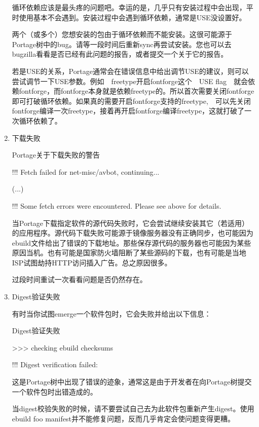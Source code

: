 \begin{enumerate}
循环依赖应该是最头疼的问题吧。幸运的是，几乎只有安装过程中会出现，平时使用基本不会遇到。安装过程中会遇到循环依赖，通常是USE没设置好。

两个（或多个）您想安装的包由于循环依赖而不能安装。这很可能源于Portage树中的bug。请等一段时间后重新sync再尝试安装。您也可以去bugzilla看看是否已经有此问题的报告，或者提交一个关于它的报告。

若是USE的关系，Portage通常会在错误信息中给出调节USE的建议，则可以尝试调节一下USE参数。例如　freetype开启fontforge这个　USE flag　就会依赖fontforge，而fontforge本身就是依赖freetype的。所以首次需要关闭fontforge即可打破循环依赖。如果真的需要开启fontforge支持的freetype,　可以先关闭fontforge编译一次freetype，接着再开启fontforge编译freetype，这就打破了一次循环依赖了。

\item 下载失败

\begin{example}{Portage关于下载失败的警告}
\begin{code}
!!! Fetch failed for net-misc/avbot, continuing...

(...)

!!! Some fetch errors were encountered.  Please see above for details.
\end{code}
\end{example}

当Portage下载指定软件的源代码失败时，它会尝试继续安装其它（若适用）的应用程序。源代码下载失败可能源于镜像服务器没有正确同步，也可能因为ebuild文件给出了错误的下载地址。那些保存源代码的服务器也可能因为某些原因当机。也有可能是国家防火墙阻断了某些源码的下载，也有可能是当地ISP试图劫持HTTP访问插入广告。总之原因很多。

过段时间重试一次看看问题是否仍然存在。

\item Digest验证失败

有时当你试图emerge一个软件包时，它会失败并给出以下信息：

\begin{example}{Digest验证失败}
\begin{code}
>>> checking ebuild checksums

!!! Digest verification failed:
\end{code}
\end{example}

这是Portage树中出现了错误的迹象，通常这是由于开发者在向Portage树提交一个软件包时出错造成的。

当digest校验失败的时候，请不要尝试自己去为此软件包重新产生digest。使用ebuild foo manifest并不能修复问题，反而几乎肯定会使问题变得更糟。


\end{enumerate}
